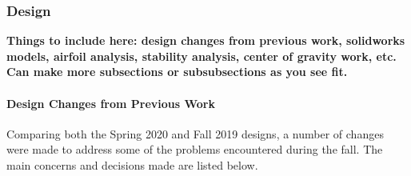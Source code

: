 \documentclass{article}
\begin{document}
\subsubsection{Design}

\textbf{Things to include here: design changes from previous work, solidworks models, airfoil analysis, stability analysis, center of gravity work, etc. Can make more subsections or subsubsections as you see fit.}

\paragraph{Design Changes from Previous Work}
Comparing both the Spring 2020 and Fall 2019 designs, a number of changes were made to address some of the problems encountered during the fall. The main concerns and decisions made are listed below.\\
\end{document}

